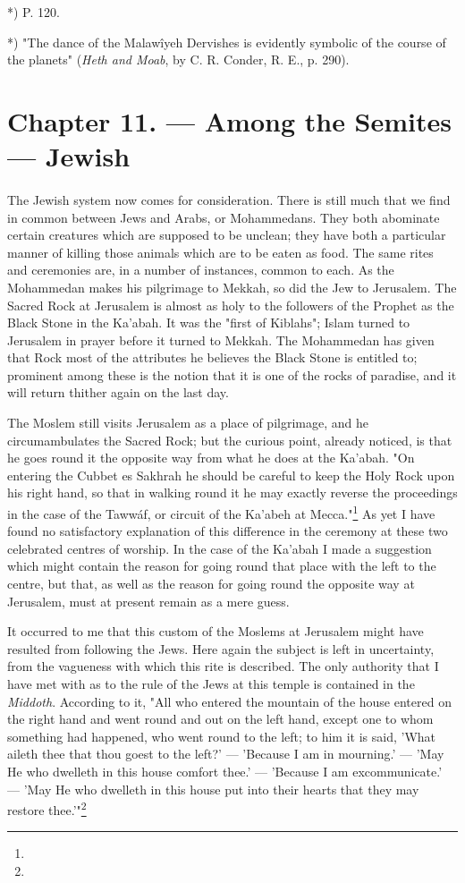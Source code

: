 \documentclass[a4paper, 11pt, oneside, polutonikogreek, english]{article}
\begin{document}
*) P. 120.

*) "The dance of the Malawîyeh Dervishes is evidently symbolic of the course of the planets" (\emph{Heth and Moab}, by C. R. Conder, R. E., p. 290).
\clearpage
\section{Chapter 11. --- Among the Semites --- Jewish}
\paragraph{}
The Jewish system now comes for consideration. There is still much that we find in common between Jews and Arabs, or Mohammedans. They both abominate certain creatures which are supposed to be unclean; they have both a particular manner of killing those animals which are to be eaten as food. The same rites and ceremonies are, in a number of instances, common to each. As the Mohammedan makes his pilgrimage to Mekkah, so did the Jew to Jerusalem. The Sacred Rock at Jerusalem is almost as holy to the followers of the Prophet as the Black Stone in the Ka'abah. It was the "first of Kiblahs"; Islam turned to Jerusalem in prayer before it turned to Mekkah. The Mohammedan has given that Rock most of the attributes he believes the Black Stone is entitled to; prominent among these is the notion that it is one of the rocks of paradise, and it will return thither again on the last day.

The Moslem still visits Jerusalem as a place of pilgrimage, and he circumambulates the Sacred Rock; but the curious point, already noticed, is that he goes round it the opposite way from what he does at the Ka'abah. "On entering the Cubbet es Sakhrah he should be careful to keep the Holy Rock upon his right hand, so that in walking round it he may exactly reverse the proceedings in the case of the Tawwáf, or circuit of the Ka'abeh at Mecca."\footnote{} As yet I have found no satisfactory explanation of this difference in the ceremony at these two celebrated centres of worship. In the case of the Ka'abah I made a suggestion which might contain the reason for going round that place with the left to the centre, but that, as well as the reason for going round the opposite way at Jerusalem, must at present remain as a mere guess.

It occurred to me that this custom of the Moslems at Jerusalem might have resulted from following the Jews. Here again the subject is left in uncertainty, from the vagueness with which this rite is described. The only authority that I have met with as to the rule of the Jews at this temple is contained in the \emph{Middoth}. According to it, "All who entered the mountain of the house entered on the right hand and went round and out on the left hand, except one to whom something had happened, who went round to the left; to him it is said, 'What aileth thee that thou goest to the left?' --- 'Because I am in mourning.' --- 'May He who dwelleth in this house comfort thee.' --- 'Because I am excommunicate.' --- 'May He who dwelleth in this house put into their hearts that they may restore thee.'"\footnote{}
\end{document}
